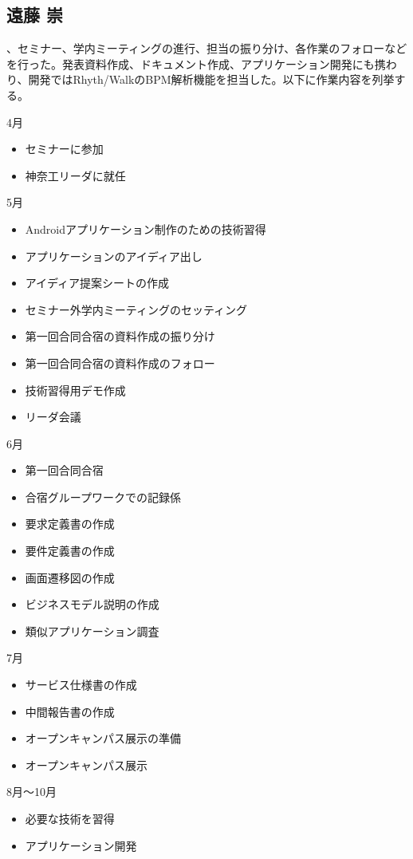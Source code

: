 \subsection{遠藤 崇}
、セミナー、学内ミーティングの進行、担当の振り分け、各作業のフォローなどを行った。発表資料作成、ドキュメント作成、アプリケーション開発にも携わり、開発ではRhyth/WalkのBPM解析機能を担当した。以下に作業内容を列挙する。

4月
\begin{itemize}
\item セミナーに参加
\item 神奈工リーダに就任
\end{itemize}
5月
\begin{itemize}
\item Androidアプリケーション制作のための技術習得
\item アプリケーションのアイディア出し
\item アイディア提案シートの作成
\item セミナー外学内ミーティングのセッティング
\item 第一回合同合宿の資料作成の振り分け
\item 第一回合同合宿の資料作成のフォロー
\item 技術習得用デモ作成
\item リーダ会議
\end{itemize}
6月
\begin{itemize}
\item 第一回合同合宿
\item 合宿グループワークでの記録係
\item 要求定義書の作成
\item 要件定義書の作成
\item 画面遷移図の作成
\item ビジネスモデル説明の作成
\item 類似アプリケーション調査
\end{itemize}
7月
\begin{itemize}
\item サービス仕様書の作成
\item 中間報告書の作成
\item オープンキャンパス展示の準備
\item オープンキャンパス展示
\end{itemize}
8月～10月
\begin{itemize}
\item 必要な技術を習得
\item アプリケーション開発
\end{itemize}
